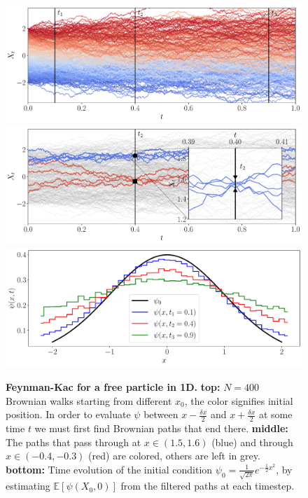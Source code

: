 \begin{figure}[H]
	\centering
	\subfloat
	{\includegraphics[width = \linewidth]{Chapter3/Figs/Raster/fkac_vs_fplanck_top.pdf}} \\
	\subfloat
	{\includegraphics[width = \linewidth]{Chapter3/Figs/Raster/fkac_vs_fplanck_mid1.pdf}} \\
	\subfloat
	{\includegraphics[width = \linewidth]{Chapter3/Figs/Raster/fkac_vs_fplanck_bottom.pdf}}
	
	\caption[Feynman-Kac for a free particle in 1D]{\textbf{Feynman-Kac for a free particle  in 1D.} \textbf{top:} $N=400$ Brownian walks starting from different $x_0$, the color signifies initial position. In order to evaluate $\psi$ between $x-\frac{\delta x}{2}$ and $x+\frac{\delta x}{2}$ at some time $t$ we must first find Brownian paths that end there. \textbf{middle:} The paths that pass through at $x \in (1.5, 1.6)$ (blue) and through $x \in (-0.4,-0.3)$ (red) are colored, others are left in grey. \textbf{bottom:} Time evolution of the initial condition $\psi_{0} = \frac{1}{\sqrt{2 \pi}} e^{-\frac{1}{2} x^{2}}$, by estimating ${\mathbb{E}}\left[\psi\left(X_{0}, 0\right)\right]$ from the filtered paths at each timestep.}
	\label{fig:fk_1d_example}
\end{figure}
